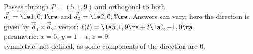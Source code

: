 {Passes through $P=(5,1,9)$ and orthogonal to both\\ $\vec d_1=\la 1,0,1\ra$ and $\vec d_2=\la 2,0,3\ra$.
}
{Answers can vary; here the direction is given by $\vec d_1\times \vec d_2$:
vector: $\ell(t) = \la 5,1,9\ra + t\la 0,-1,0\ra$\\
parametric: $x= 5$, $y=1-t$, $z = 9$\\
symmetric: not defined, as some components of the direction are 0.
}

